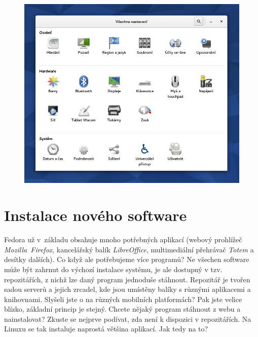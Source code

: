 \begin{figure}[t]
\begin{center}
\includegraphics[width=\textwidth]{img/nastaveni}
 \label{fig:nastaveni}
\end{center}
\end{figure}

\section*{Instalace nového software}
Fedora už v~základu obsahuje mnoho potřebných aplikací (webový prohlížeč \emph{Mozilla~Firefox}, kancelářský balík \emph{LibreOffice}, multimediální přehrávač \emph{Totem} a desítky dalších). Co když ale potřebujeme více programů? Ne všechen software může být zahrnut do výchozí instalace systému, je ale dostupný v tzv. repozitářích, z nichž lze daný program jednoduše stáhnout. Repozitář je tvořen sadou serverů a jejich zrcadel, kde jsou umístěny balíky s různými aplikacemi a knihovnami. Slyšeli jste o  na různých mobilních platformách? Pak jste velice blízko, základní princip je stejný. Chcete nějaký program stáhnout z webu a nainstalovat? Zkuste se nejprve podívat, zda není k dispozici v repozitářích. Na Linuxu se tak instaluje naprostá většina aplikací. Jak tedy na to?

